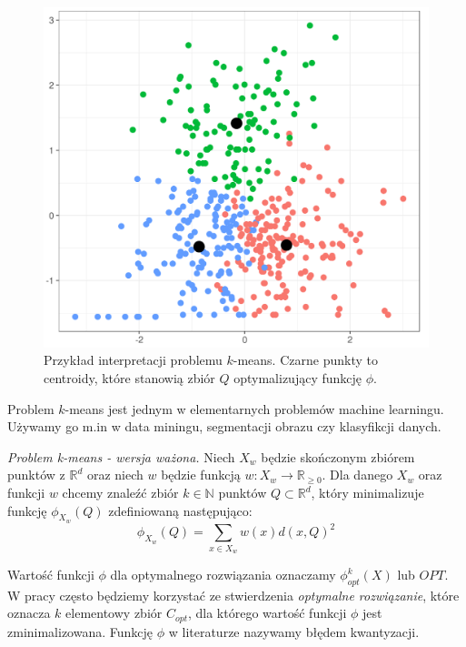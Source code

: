 \begin{figure}[H]
    \centering
    \includegraphics[totalheight=5cm]{cluster.png}
    \caption{Przykład interpretacji problemu $k$-means. Czarne punkty to centroidy, które stanowią zbiór $Q$ optymalizujący funkcję $\phi$.}
\end{figure}

\noindent
Problem $k$-means jest jednym w elementarnych problemów machine learningu.
Używamy go m.in w data miningu, segmentacji obrazu czy klasyfikcji danych. 

\begin{definition}
    \emph{Problem k-means - wersja ważona.} Niech $X_{w}$ będzie skończonym zbiórem punktów z $\mathbb{R}^{d}$ oraz niech $w$ będzie funkcją $w: X_{w} \rightarrow \mathbb{R}_{\ge0}$. 
    Dla danego $X_{w}$ oraz funkcji $w$ chcemy znaleźć zbiór $k \in \mathbb{N}$ punktów $Q \subset \mathbb{R}^{d}$, który minimalizuje funkcję $\phi_{X_{w}}(Q)$ zdefiniowaną następująco:
    \begin{equation}
        \phi_{X_{w}}(Q) = \sum_{x \in X_{w}} w(x) d(x, Q)^{2}
    \end{equation}
\end{definition}

\noindent
Wartość funkcji $\phi$ dla optymalnego rozwiązania oznaczamy $\phi_{opt}^{k}(X)$ lub $OPT$.
W pracy często będziemy korzystać ze stwierdzenia \textit{optymalne rozwiązanie}, które oznacza $k$ elementowy zbiór $C_{opt}$, dla którego wartość funkcji $\phi$ jest zminimalizowana. 
Funkcję $\phi$ w literaturze nazywamy błędem kwantyzacji.

